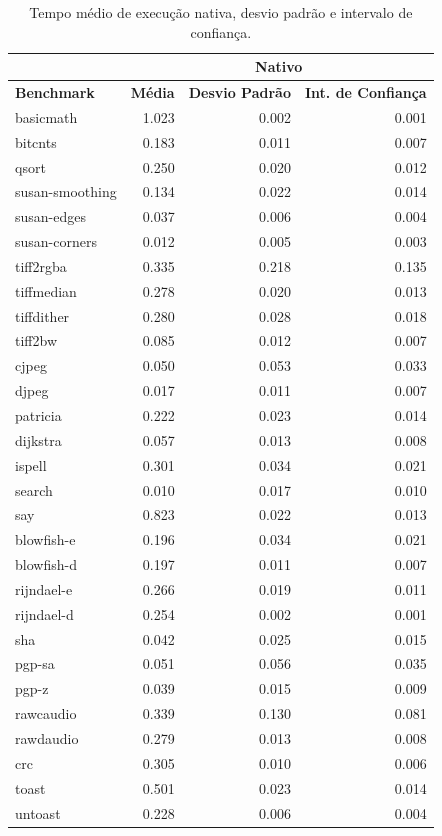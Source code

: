 \documentclass[11pt,twoside]{article}
\begin{document}
\begin{table}
 \caption{Tempo médio de execução nativa, desvio padrão e intervalo de confiança.}
 \begin{center}
 \begin{tabular}{|l|r|r|r|}
   \cline{2-4}
   \multicolumn{1}{c|}{}& \multicolumn{3}{|c|}{Nativo} \\ \hline
   \bf{Benchmark} & \bf{Média} & \bf{Desvio Padrão} & \bf{Int. de Confiança} \\ \hline
   basicmath & 1.023 & 0.002 & 0.001\\ \hline
   bitcnts & 0.183 & 0.011 & 0.007\\ \hline
   qsort & 0.250 & 0.020 & 0.012\\ \hline
   susan-smoothing & 0.134 & 0.022 & 0.014\\ \hline
   susan-edges & 0.037 & 0.006 & 0.004\\ \hline
   susan-corners & 0.012 & 0.005 & 0.003\\ \hline
   tiff2rgba & 0.335 & 0.218 & 0.135\\ \hline
   tiffmedian & 0.278 & 0.020 & 0.013\\ \hline 
   tiffdither & 0.280 & 0.028 & 0.018\\ \hline 
   tiff2bw & 0.085 & 0.012 & 0.007\\ \hline 
   cjpeg & 0.050 & 0.053 & 0.033\\ \hline 
   djpeg & 0.017 & 0.011 & 0.007\\ \hline 
   patricia & 0.222 & 0.023 & 0.014\\ \hline 
   dijkstra & 0.057 & 0.013 & 0.008\\ \hline 
   ispell & 0.301 & 0.034 & 0.021\\ \hline 
   search & 0.010 & 0.017 & 0.010\\ \hline 
   say & 0.823 & 0.022 & 0.013\\ \hline 
   blowfish-e & 0.196 & 0.034 & 0.021\\ \hline 
   blowfish-d & 0.197 & 0.011 & 0.007\\ \hline 
   rijndael-e & 0.266 & 0.019 & 0.011\\ \hline 
   rijndael-d & 0.254 & 0.002 & 0.001\\ \hline 
   sha & 0.042 & 0.025 & 0.015\\ \hline 
   pgp-sa & 0.051 & 0.056 & 0.035\\ \hline 
   pgp-z & 0.039 & 0.015 & 0.009\\ \hline 
   rawcaudio & 0.339 & 0.130 & 0.081\\ \hline 
   rawdaudio & 0.279 & 0.013 & 0.008\\ \hline 
   crc & 0.305 & 0.010 & 0.006\\ \hline 
   toast & 0.501 & 0.023 & 0.014\\ \hline 
   untoast & 0.228 & 0.006 & 0.004 \\
   \hline
  \end{tabular}
  \label{tab:tempos_nativo}
 \end{center}
\end{table}
\end{document}
